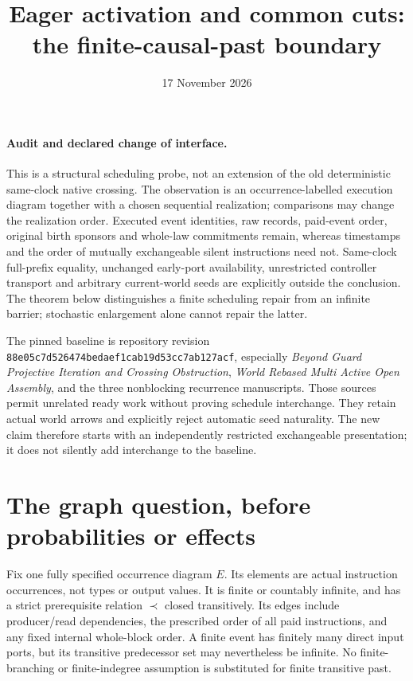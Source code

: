 \documentclass{article}
\title{Eager activation and common cuts: the finite-causal-past boundary}
\author{}\date{17 November 2026}
\begin{document}
\maketitle
\paragraph{Audit and declared change of interface.}
This is a structural scheduling probe, not an extension of the old deterministic same-clock native crossing. The observation is an occurrence-labelled execution diagram together with a chosen sequential realization; comparisons may change the realization order. Executed event identities, raw records, paid-event order, original birth sponsors and whole-law commitments remain, whereas timestamps and the order of mutually exchangeable silent instructions need not. Same-clock full-prefix equality, unchanged early-port availability, unrestricted controller transport and arbitrary current-world seeds are explicitly outside the conclusion. The theorem below distinguishes a finite scheduling repair from an infinite barrier; stochastic enlargement alone cannot repair the latter.

The pinned baseline is repository revision \texttt{88e05c7d526474bedaef1cab19d53cc7ab127acf}, especially \emph{Beyond Guard Projective Iteration and Crossing Obstruction}, \emph{World Rebased Multi Active Open Assembly}, and the three nonblocking recurrence manuscripts. Those sources permit unrelated ready work without proving schedule interchange. They retain actual world arrows and explicitly reject automatic seed naturality. The new claim therefore starts with an independently restricted exchangeable presentation; it does not silently add interchange to the baseline.

\section{The graph question, before probabilities or effects}
Fix one fully specified occurrence diagram $E$. Its elements are actual instruction occurrences, not types or output values. It is finite or countably infinite, and has a strict prerequisite relation $\prec$ closed transitively. Its edges include producer/read dependencies, the prescribed order of all paid instructions, and any fixed internal whole-block order. A finite event has finitely many direct input ports, but its transitive predecessor set may nevertheless be infinite. No finite-branching or finite-indegree assumption is substituted for finite transitive past.
\end{document}
